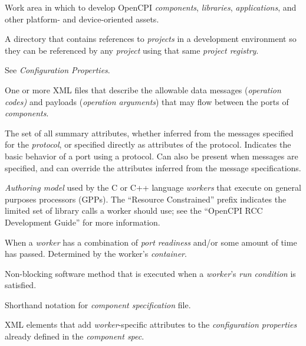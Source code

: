 \begin{description}[style=nextline]
\item[Project]
Work area in which to develop OpenCPI \textit{components}, \textit{libraries}, \textit{applications}, and other platform- and device-oriented assets.

\item[Project Registry]
A directory that contains references to \textit{projects} in a development environment so they can be referenced by any \textit{project} using that same \textit{project registry}.

\item[Property]
See \textit{Configuration Properties}.

\item[Protocol Specification (OPS)]
One or more XML files that describe the allowable data messages (\textit{operation codes)} and payloads (\textit{operation arguments}) that may flow between the ports of \textit{components}.

\item[Protocol Summary]
The set of all summary attributes, whether inferred from the messages specified for the \textit{protocol}, or specified directly as attributes of the protocol. Indicates the basic behavior of a port using a protocol.  Can also be present when messages are specified, and can override the attributes inferred from the message specifications.

\item[RCC Authoring Model]
\textit{Authoring model} used by the C or C++ language \textit{workers} that execute on general purposes processors (GPPs). The ``Resource Constrained'' prefix indicates the limited set of library calls a worker should use; see the ``OpenCPI RCC Development Guide'' for more information.

\item[Run Condition]
When a \textit{worker} has a combination of \textit{port readiness} and/or some amount of time has passed. Determined by the worker's \textit{container}.

\item[Run Method]
Non-blocking software method that is executed when a \textit{worker}'s \textit{run condition} is satisfied.

\item[Spec file]
Shorthand notation for \textit{component specification} file.

\item[SpecProperty]
XML elements that add \textit{worker}-specific attributes to the \textit{configuration properties} already defined in the \textit{component spec}.


\end{description}
